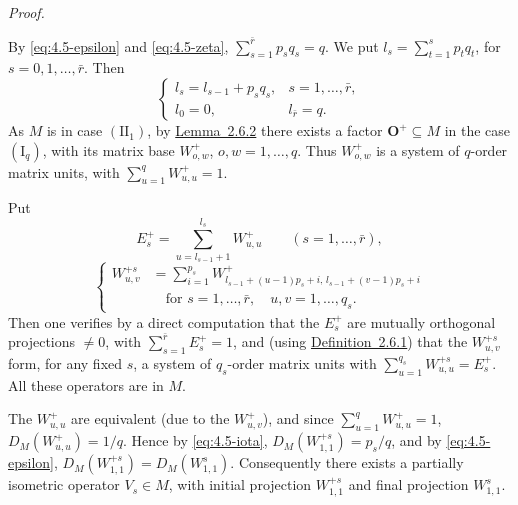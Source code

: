 \documentclass[b5paper,twoside]{article}
\newcommand{\lemref}[2]{\hyperref[#1]{\mbox{Lemma~#2}}}
\newcommand{\defref}[2]{\hyperref[#1]{\mbox{Definition~#2}}}
\theoremstyle{mvnplain}
\renewenvironment{proof}[1][Proof]{%
  \par\addvspace{0.35\baselineskip}%
  \noindent\textit{#1.}\ \normalfont\ignorespaces
}{%
  \par\addvspace{0.35\baselineskip}%
}
\newcommand{\M}{\mathbf M}
\def\M{M}%
\begin{document}
\begin{proof}
By \eqref{eq:4.5-epsilon} and \eqref{eq:4.5-zeta},
\(\sum_{s=1}^{\bar r}p_sq_s=q\). We put
\(l_s=\sum_{t=1}^{s}p_tq_t\), for \(s=0,1,\ldots,\bar r\). Then
\begin{equation}\tag{4.5.\(\eta\)}\label{eq:4.5-eta}
 \begin{cases}
 l_s=l_{s-1}+p_sq_s,&s=1,\ldots,\bar r,\\
 l_0=0,&l_{\bar r}=q.
 \end{cases}
\end{equation}
As \(\M\) is in case \((\mathrm{II}_1)\), by \lemref{lem:2.6.2}{2.6.2}
there exists a factor \(\mathbf O^+\subseteq\M\) in the case
\((\mathrm I_q)\), with its matrix base \(W^+_{o,w}\),
\(o,w=1,\ldots,q\). Thus \(W^+_{o,w}\) is a system of \(q\)-order matrix
units, with \(\sum_{u=1}^{q}W^+_{u,u}=1\).

Put
\begin{equation}\tag{4.5.\(\theta\)}\label{eq:4.5-theta}
 E_s^+=\sum_{u=l_{s-1}+1}^{l_s}W^+_{u,u}
 \qquad(s=1,\ldots,\bar r),
\end{equation}
\begin{equation}\tag{4.5.\(\iota\)}\label{eq:4.5-iota}
 \left\{\begin{aligned}
 W^{+s}_{u,v}&=\sum_{i=1}^{p_s}
 W^+_{l_{s-1}+(u-1)p_s+i,\,l_{s-1}+(v-1)p_s+i}\\
 &\quad\text{for }s=1,\ldots,\bar r,\quad u,v=1,\ldots,q_s.
 \end{aligned}\right.
\end{equation}
Then one verifies by a direct computation that the \(E_s^+\) are mutually
orthogonal projections \(\ne0\), with \(\sum_{s=1}^{\bar r}E_s^+=1\), and
(using \defref{def:2.6.1}{2.6.1}) that the \(W^{+s}_{u,v}\) form, for any
fixed \(s\), a system of \(q_s\)-order matrix units with
\(\sum_{u=1}^{q_s}W^{+s}_{u,u}=E_s^+\). All these operators are in \(\M\).

The \(W^+_{u,u}\) are equivalent (due to the \(W^+_{u,v}\)), and since
\(\sum_{u=1}^{q}W^+_{u,u}=1\), \(D_{\M}(W^+_{u,u})=1/q\). Hence by
\eqref{eq:4.5-iota}, \(D_{\M}(W^{+s}_{1,1})=p_s/q\), and by
\eqref{eq:4.5-epsilon},
\(D_{\M}(W^{+s}_{1,1})=D_{\M}(W^s_{1,1})\). Consequently there exists a
partially isometric operator \(V_s\in\M\), with initial projection
\(W^{+s}_{1,1}\) and final projection \(W^s_{1,1}\).


\end{proof}
\end{document}
